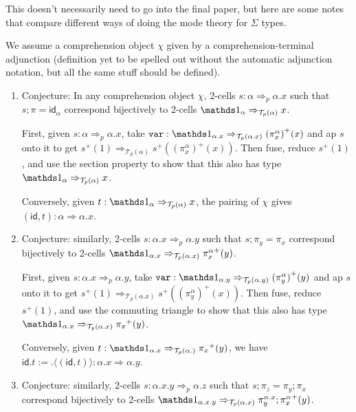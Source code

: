 \documentclass[10pt]{article}
\theoremstyle{definition}
\newcommand{\tcell}{\Rightarrow}
\newcommand{\id}{\mathsf{id}}
\newcommand\TrPlus[2]{\ensuremath{{#1}^+(#2)}}
\newcommand\El[2]{\mathcal{T}_{#1}(#2)}
\newcommand\ap[2]{\ensuremath{#1 \langle #2 \rangle }}
\begin{document}

This doesn't necessarily need to go into the final paper, but here are
some notes that compare different ways of doing the mode theory for
$\Sigma$ types.

We assume a comprehension object $\chi$ given by a
comprehension-terminal adjunction (definition yet to be spelled out
without the automatic adjunction notation, but all the same stuff should
be defined).


\begin{enumerate}

\item \label{sigma:total-to-fiber0} Conjecture: In any comprehension
  object $\chi$, 2-cells $s : \alpha \tcell_p \alpha.x$ such that $s;\pi
  = \id_\alpha$ correspond bijectively to 2-cells $\One_\alpha
  \tcell_{\El{p}{\alpha}} x$.

  First, given $s : \alpha \tcell_p \alpha.x$, take $\mtt{var} : \One_{\alpha.x}
  \tcell_{\El{p}{\alpha.x}} \TrPlus{(\pi^\alpha_x)}{x}$ and ap $s$ onto
  it to get $\TrPlus{s}{1} \tcell_{\El{p}{\alpha}}
  \TrPlus{s}{\TrPlus{(\pi^\alpha_x)}{x}}$.  Then fuse, reduce
  $\TrPlus{s}{1}$, and use the section property to show that this also
  has type
  $\One_\alpha \tcell_{\El{p}{\alpha}} x$.

  Conversely, given $t : \One_\alpha \tcell_{\El{p}{\alpha}} x$,
  the pairing of $\chi$ gives $(\id, t) : \alpha \tcell \alpha.x$.

\item \label{sigma:total-to-fiber1} Conjecture: similarly, 2-cells $s :
  \alpha.x \tcell_p \alpha.y$ such that $s;\pi_y = \pi_x$ correspond
  bijectively to 2-cells $\One_{\alpha.x} \tcell_{\El{p}{\alpha.x}}
  \TrPlus{\pi^\alpha_x}{y}$.

  First, given $s : \alpha.x \tcell_p \alpha.y$, take $\mtt{var} :
  \One_{\alpha.y} \tcell_{\El{p}{\alpha.y}} \TrPlus{(\pi^\alpha_y)}{y}$ and
  ap $s$ onto it to get $\TrPlus{s}{1} \tcell_{\El{p}{\alpha.x}}
  \TrPlus{s}{\TrPlus{(\pi^\alpha_y)}{x}}$.  Then fuse, reduce
  $\TrPlus{s}{1}$, and use the commuting triangle to show that this also
  has type $\One_{\alpha.x} \tcell_{\El{p}{\alpha.x}} \TrPlus{\pi_x} y$.

  Conversely, given $t : \One_{\alpha.x} \tcell_{\El{p}{\alpha.}}
  \TrPlus{\pi_x} y$, we have $\id.t := \ap{.}{(\id, t)} : \alpha.x \tcell \alpha.y$.

\item \label{sigma:total-to-fiber2} Conjecture: similarly, 2-cells $s :
  \alpha.x.y \tcell_p \alpha.z$ such that $s;\pi_z = \pi_y;\pi_x$
  correspond bijectively to 2-cells $\One_{\alpha.x.y}
  \tcell_{\El{p}{\alpha.x}} \TrPlus{\pi^{\alpha.x}_y;\pi^\alpha_x}{y}$.


\end{enumerate}
\end{document}
